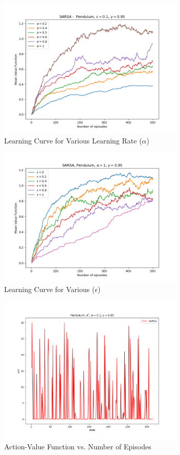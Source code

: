 \documentclass[conference]{IEEEtran}
\begin{document}
\begin{figure}[!htbp]
\centerline{\includegraphics[width=3.5in]{p_sarsa_learning_curves_alpha}}
\caption{Learning Curve for Various Learning Rate ($\alpha$)}
\label{fig}
\end{figure}
\FloatBarrier

\begin{figure}[!htbp]
\centerline{\includegraphics[width=3.5in]{p_sarsa_learning_curves_epsilon}}
\caption{Learning Curve for Various ($\epsilon$)}
\label{fig}
\end{figure}
\FloatBarrier

\begin{figure}[!htbp]
\centerline{\includegraphics[width=3.5in]{p_sarsa_policy}}
\caption{Action-Value Function vs. Number of Episodes}
\label{fig}
\end{figure}
\FloatBarrier
\end{document}
